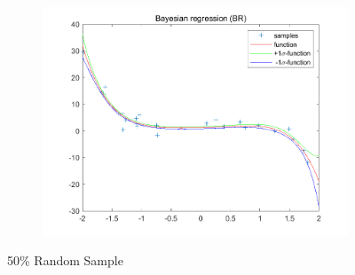 \documentclass{article}
\begin{document}
\begin{figure}
\begin{subfigure}[b]{0.475\textwidth}
        \includegraphics[width=\textwidth]{fig/1c-50-br.png} 
    \end{subfigure}
    \caption{50\% Random Sample}
\end{figure}
\end{document}
